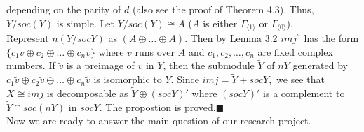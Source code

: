 depending on the parity of $d$ (also see the proof of Theorem 4.3). Thus, $Y/soc(Y)$ is simple. Let $Y/soc(Y)\cong A$ ($A$ is either  $\Gamma_{\langle 1\rangle}$ or $\Gamma_{\langle 0\rangle}$).
\\Represent $n(Y/socY)$ as $(A\oplus\dots \oplus A)$. Then by Lemma 3.2 $imj^{''}$ has the form $\{c_1v\oplus c_2\oplus\dots \oplus c_nv\}$ where $v$ runs over $A$ and $c_1, c_2, \dots ,c_n$ are fixed complex numbers. If $\widetilde{v}$ is a preimage of $v$ in $Y$, then the submodule $\widetilde{Y}$ of $nY $ generated by $c_1 \widetilde{v}\oplus c_2 \widetilde{v}\oplus\dots\oplus c_n\widetilde{v}$ is isomorphic to $Y$. Since $imj=\widetilde{Y}+socY,$ we see that $X\cong imj$ is decomposable as $\widetilde{Y}\oplus (socY)'$ where $(socY)'$ is a complement to $\widetilde{Y}\cap soc(nY)$ in $socY$. The propostion is proved.$\blacksquare$
\\Now we are ready to answer the main question of our research project.

